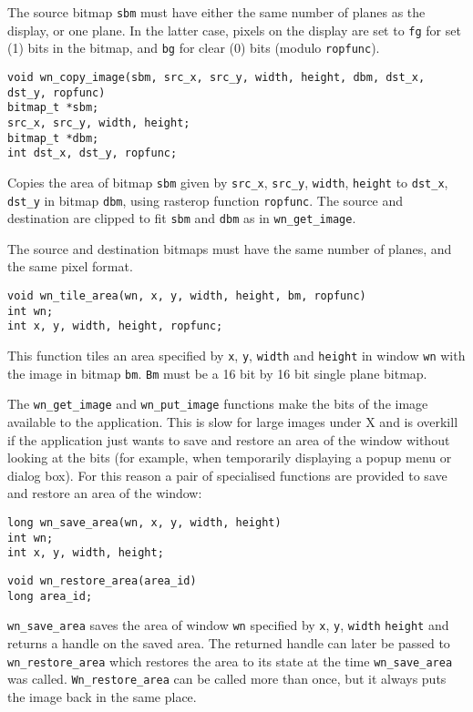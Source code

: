 The source bitmap {\tt sbm} must have either the same number of planes as
the display, or one plane.
In the latter case, pixels on the display are set to {\tt fg} for set (1)
bits in the bitmap, and {\tt bg} for clear (0) bits (modulo {\tt ropfunc}).
\begin{verbatim}
void wn_copy_image(sbm, src_x, src_y, width, height, dbm, dst_x, dst_y, ropfunc)
bitmap_t *sbm;
src_x, src_y, width, height;
bitmap_t *dbm;
int dst_x, dst_y, ropfunc;
\end{verbatim}
Copies the area of bitmap {\tt sbm} given by {\tt src\_x}, {\tt src\_y},
{\tt width}, {\tt height} to {\tt dst\_x}, {\tt dst\_y} in bitmap {\tt dbm},
using rasterop function {\tt ropfunc}.
The source and destination are clipped to fit {\tt sbm} and {\tt dbm} as in
{\tt wn\_get\_image}.

The source and destination bitmaps must have the same number of planes, and
the same pixel format.

\begin{verbatim}
void wn_tile_area(wn, x, y, width, height, bm, ropfunc)
int wn;
int x, y, width, height, ropfunc;
\end{verbatim}

This function tiles an area specified by {\tt x}, {\tt y}, {\tt width} and
{\tt height} in window {\tt wn} with the image in bitmap {\tt bm}.
{\tt Bm} must be a 16 bit by 16 bit single plane bitmap.

The {\tt wn\_get\_image} and {\tt wn\_put\_image} functions make the bits
of the image available to the application.
This is slow for large images under X and is overkill if the application
just wants to save and restore an
area of the window without looking at the bits (for example, when
temporarily displaying a popup menu or dialog box).
For this reason a pair of specialised functions are provided to save
and restore an area of the window:
\begin{verbatim}
long wn_save_area(wn, x, y, width, height)
int wn;
int x, y, width, height;
\end{verbatim}
\begin{verbatim}
void wn_restore_area(area_id)
long area_id;
\end{verbatim}
{\tt wn\_save\_area} saves the area of window {\tt wn} specified by
{\tt x}, {\tt y}, {\tt width} {\tt height} and returns a handle on the
saved area.
The returned handle can later be passed to {\tt wn\_restore\_area} which
restores the area to its state at the time {\tt wn\_save\_area} was called.
{\tt Wn\_restore\_area} can be called more than once, but it always puts
the image back in the same place.

